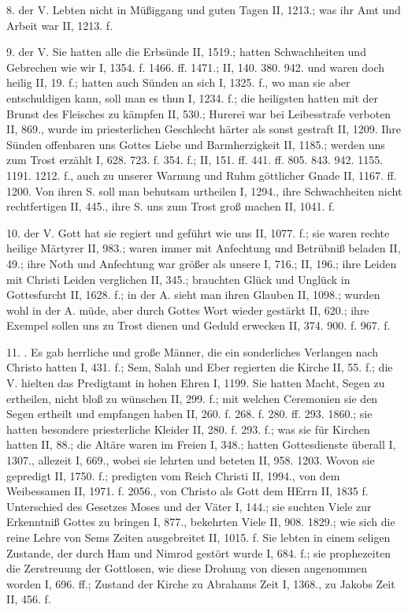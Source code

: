 8.  der V. Lebten nicht in Müßiggang und guten Tagen II, 1213.; was ihr Amt und Arbeit war II, 1213. f.

9.  der V. Sie hatten alle die Erbsünde II, 1519.; hatten Schwachheiten und Gebrechen wie wir I, 1354. f. 1466. ff. 1471.; II, 140. 380. 942. und waren doch heilig II, 19. f.; hatten auch Sünden an sich I, 1325. f., wo man sie aber entschuldigen kann, soll man es thun I, 1234. f.; die heiligsten hatten mit der Brunst des Fleisches zu kämpfen II, 530.; Hurerei war bei Leibesstrafe verboten II, 869., wurde im priesterlichen Geschlecht härter als sonst gestraft II, 1209. Ihre Sünden offenbaren uns Gottes Liebe und Barmherzigkeit II, 1185.; werden uns zum Trost erzählt I, 628. 723. f. 354. f.; II, 151. ff. 441. ff. 805. 843. 942. 1155. 1191. 1212. f., auch zu unserer Warnung und Ruhm göttlicher Gnade II, 1167. ff. 1200. Von ihren S. soll man behutsam urtheilen I, 1294., ihre Schwachheiten nicht rechtfertigen II, 445., ihre S. uns zum Trost groß machen II, 1041. f.

10.  der V. Gott hat sie regiert und geführt wie uns II, 1077. f.; sie waren rechte heilige Märtyrer II, 983.; waren immer mit Anfechtung und Betrübniß beladen II, 49.; ihre Noth und Anfechtung war größer als unsere I, 716.; II, 196.; ihre Leiden mit Christi Leiden verglichen II, 345.; brauchten Glück und Unglück in Gottesfurcht II, 1628. f.; in der A. sieht man ihren Glauben II, 1098.; wurden wohl in der A. müde, aber durch Gottes Wort wieder gestärkt II, 620.; ihre Exempel sollen uns zu Trost dienen und Geduld erwecken II, 374. 900. f. 967. f.

11. . Es gab herrliche und große Männer, die ein sonderliches Verlangen nach Christo hatten I, 431. f.; Sem, Salah und Eber regierten die Kirche II, 55. f.; die V. hielten das Predigtamt in hohen Ehren I, 1199. Sie hatten Macht, Segen zu ertheilen, nicht bloß zu wünschen II, 299. f.; mit welchen Ceremonien sie den Segen ertheilt und empfangen haben II, 260. f. 268. f. 280. ff. 293. 1860.; sie hatten besondere priesterliche Kleider II, 280. f. 293. f.; was sie für Kirchen hatten II, 88.; die Altäre waren im Freien I, 348.; hatten Gottesdienste überall I, 1307., allezeit I, 669., wobei sie lehrten und beteten II, 958. 1203. Wovon sie gepredigt II, 1750. f.; predigten vom Reich Christi II, 1994., von dem Weibessamen II, 1971. f. 2056., von Christo als Gott dem HErrn II, 1835 f. Unterschied des Gesetzes Moses und der Väter I, 144.; sie suchten Viele zur Erkenntniß Gottes zu bringen I, 877., bekehrten Viele II, 908. 1829.; wie sich die reine Lehre von Sems Zeiten ausgebreitet II, 1015. f. Sie lebten in einem seligen Zustande, der durch Ham und Nimrod gestört wurde I, 684. f.; sie prophezeiten die Zerstreuung der Gottlosen, wie diese Drohung von diesen angenommen worden I, 696. ff.; Zustand der Kirche zu Abrahams Zeit I, 1368., zu Jakobs Zeit II, 456. f.

